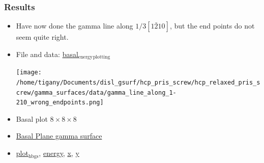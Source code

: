 \documentclass[11pt]{article}
\begin{document}
\subsubsection{Results}
\label{sec:org605b3c3}
\begin{itemize}
\item Have now done the gamma line along \(1/3[1\bar{2}10]\), but the end points
do not seem quite right.
\item File and data: \href{file:///home/tigany/Documents/disl\_gsurf/hcp\_pris\_screw/hcp\_relaxed\_pris\_screw/gamma\_surfaces/data/plot\_hsbc\_pkl.py}{basal\(_{\text{energy}}\)\(_{\text{plotting}}\)} \begin{center}
\texttt{[image: /home/tigany/Documents/disl\_gsurf/hcp\_pris\_screw/hcp\_relaxed\_pris\_screw/gamma\_surfaces/data/gamma\_line\_along\_1-210\_wrong\_endpoints.png]}
\end{center}
\item Basal plot \(8\times 8\times 8\)
\item \href{file:///home/tigany/Documents/disl\_gsurf/hcp\_pris\_screw/hcp\_relaxed\_pris\_screw/gamma\_surfaces/data/supercell\_8-8-8/Figures/gamma\_surface\_8-8-8\_basal\_tbe.png}{Basal Plane gamma surface}
\item \href{file:///home/tigany/Documents/disl\_gsurf/hcp\_pris\_screw/hcp\_relaxed\_pris\_screw/gamma\_surfaces/data/supercell\_8-8-8/plot\_hsbc\_pkl.py}{plot\(_{\text{hbgs}}\)}, \href{file:///home/tigany/Documents/disl\_gsurf/hcp\_pris\_screw/hcp\_relaxed\_pris\_screw/gamma\_surfaces/data/supercell\_8-8-8/hgsBte888.pkl}{energy}, \href{file:///home/tigany/Documents/disl\_gsurf/hcp\_pris\_screw/hcp\_relaxed\_pris\_screw/gamma\_surfaces/data/supercell\_8-8-8/hgsBtx888.pkl}{x}, \href{file:///home/tigany/Documents/disl\_gsurf/hcp\_pris\_screw/hcp\_relaxed\_pris\_screw/gamma\_surfaces/data/supercell\_8-8-8/hgsBty888.pkl}{y}
\end{itemize}
\end{document}
